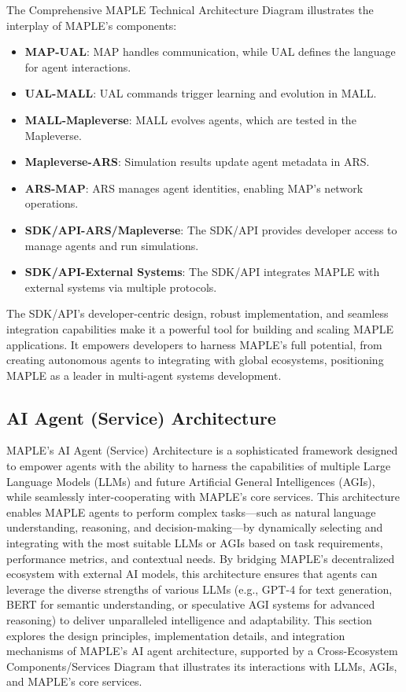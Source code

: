 \documentclass[a4paper,11pt]{article}
\begin{document}
The Comprehensive MAPLE Technical Architecture Diagram illustrates the interplay of MAPLE’s components:
\begin{itemize}[leftmargin=*]
    \item \textbf{MAP-UAL}: MAP handles communication, while UAL defines the language for agent interactions.
    \item \textbf{UAL-MALL}: UAL commands trigger learning and evolution in MALL.
    \item \textbf{MALL-Mapleverse}: MALL evolves agents, which are tested in the Mapleverse.
    \item \textbf{Mapleverse-ARS}: Simulation results update agent metadata in ARS.
    \item \textbf{ARS-MAP}: ARS manages agent identities, enabling MAP’s network operations.
    \item \textbf{SDK/API-ARS/Mapleverse}: The SDK/API provides developer access to manage agents and run simulations.
    \item \textbf{SDK/API-External Systems}: The SDK/API integrates MAPLE with external systems via multiple protocols.
\end{itemize}

The SDK/API’s developer-centric design, robust implementation, and seamless integration capabilities make it a powerful tool for building and scaling MAPLE applications. It empowers developers to harness MAPLE’s full potential, from creating autonomous agents to integrating with global ecosystems, positioning MAPLE as a leader in multi-agent systems development.

\pagebreak

\subsection{AI Agent (Service) Architecture}
MAPLE’s AI Agent (Service) Architecture is a sophisticated framework designed to empower agents with the ability to harness the capabilities of multiple Large Language Models (LLMs) and future Artificial General Intelligences (AGIs), while seamlessly inter-cooperating with MAPLE’s core services. This architecture enables MAPLE agents to perform complex tasks—such as natural language understanding, reasoning, and decision-making—by dynamically selecting and integrating with the most suitable LLMs or AGIs based on task requirements, performance metrics, and contextual needs. By bridging MAPLE’s decentralized ecosystem with external AI models, this architecture ensures that agents can leverage the diverse strengths of various LLMs (e.g., GPT-4 for text generation, BERT for semantic understanding, or speculative AGI systems for advanced reasoning) to deliver unparalleled intelligence and adaptability. This section explores the design principles, implementation details, and integration mechanisms of MAPLE’s AI agent architecture, supported by a Cross-Ecosystem Components/Services Diagram that illustrates its interactions with LLMs, AGIs, and MAPLE’s core services.
\end{document}
